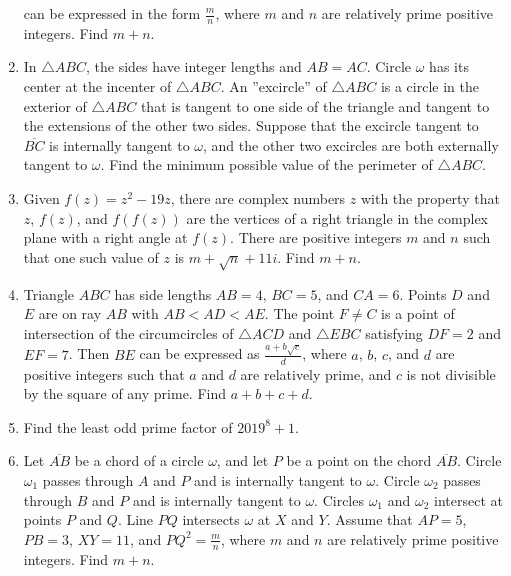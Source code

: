 \documentclass{article}
\begin{document}
\begin{enumerate}[label=\arabic*., itemsep=0.5em]
can be expressed in the form \(\tfrac{m}{n}\), where \(m\) and \(n\) are relatively prime positive integers. Find \(m+n\).\par \vspace{0.5em}\item In \(\triangle ABC\), the sides have integer lengths and \(AB=AC\). Circle \(\omega\) has its center at the incenter of \(\triangle ABC\). An ''excircle'' of \(\triangle ABC\) is a circle in the exterior of \(\triangle ABC\) that is tangent to one side of the triangle and tangent to the extensions of the other two sides. Suppose that the excircle tangent to \(\overline{BC}\) is internally tangent to \(\omega\), and the other two excircles are both externally tangent to \(\omega\). Find the minimum possible value of the perimeter of \(\triangle ABC\).\par \vspace{0.5em}\item Given \(f(z) = z^2-19z\), there are complex numbers \(z\) with the property that \(z\), \(f(z)\), and \(f(f(z))\) are the vertices of a right triangle in the complex plane with a right angle at \(f(z)\). There are positive integers \(m\) and \(n\) such that one such value of \(z\) is \(m+\sqrt{n}+11i\). Find \(m+n\).\par \vspace{0.5em}\item Triangle \(ABC\) has side lengths \(AB=4\), \(BC=5\), and \(CA=6\). Points \(D\) and \(E\) are on ray \(AB\) with \(AB<AD<AE\). The point \(F \neq C\) is a point of intersection of the circumcircles of \(\triangle ACD\) and \(\triangle EBC\) satisfying \(DF=2\) and \(EF=7\). Then \(BE\) can be expressed as \(\tfrac{a+b\sqrt{c}}{d}\), where \(a\), \(b\), \(c\), and \(d\) are positive integers such that \(a\) and \(d\) are relatively prime, and \(c\) is not divisible by the square of any prime. Find \(a+b+c+d\).\par \vspace{0.5em}\item Find the least odd prime factor of \(2019^8 + 1\).\par \vspace{0.5em}\item Let \(\overline{AB}\) be a chord of a circle \(\omega\), and let \(P\) be a point on the chord \(\overline{AB}\). Circle \(\omega_1\) passes through \(A\) and \(P\) and is internally tangent to \(\omega\). Circle \(\omega_2\) passes through \(B\) and \(P\) and is internally tangent to \(\omega\). Circles \(\omega_1\) and \(\omega_2\) intersect at points \(P\) and \(Q\). Line \(PQ\) intersects \(\omega\) at \(X\) and \(Y\). Assume that \(AP=5\), \(PB=3\), \(XY=11\), and \(PQ^2 = \tfrac{m}{n}\), where \(m\) and \(n\) are relatively prime positive integers. Find \(m+n\).




\end{enumerate}
\end{document}

